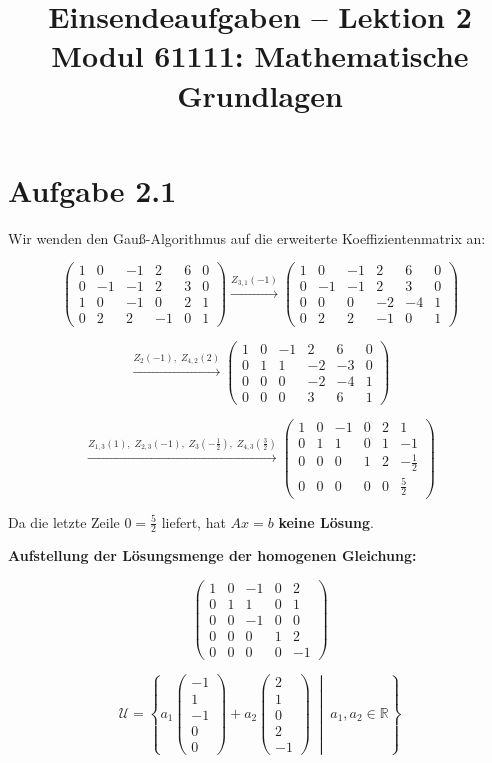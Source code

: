 \documentclass[a4paper,12pt]{article}
\title{Einsendeaufgaben -- Lektion 2\\[0.5em]
\large Modul 61111: Mathematische Grundlagen}
\author{}
\date{}
\begin{document}
\maketitle

\section*{Aufgabe 2.1}

Wir wenden den Gauß-Algorithmus auf die erweiterte Koeffizientenmatrix an:

\[
\left(\begin{array}{ccccc|c}
1 & 0 & -1 & 2 & 6 & 0 \\
0 & -1 & -1 & 2 & 3 & 0 \\
1 & 0 & -1 & 0 & 2 & 1 \\
0 & 2 & 2 & -1 & 0 & 1
\end{array}\right)
\xrightarrow{Z_{3,1}(-1)}
\left(\begin{array}{ccccc|c}
1 & 0 & -1 & 2 & 6 & 0 \\
0 & -1 & -1 & 2 & 3 & 0 \\
0 & 0 & 0 & -2 & -4 & 1 \\
0 & 2 & 2 & -1 & 0 & 1
\end{array}\right)
\]

\[
\xrightarrow{Z_2(-1),\; Z_{4,2}(2)}
\left(\begin{array}{ccccc|c}
1 & 0 & -1 & 2 & 6 & 0 \\
0 & 1 & 1 & -2 & -3 & 0 \\
0 & 0 & 0 & -2 & -4 & 1 \\
0 & 0 & 0 & 3 & 6 & 1
\end{array}\right)
\]

\[
\xrightarrow{Z_{1,3}(1),\; Z_{2,3}(-1),\; Z_3\!\left(-\tfrac{1}{2}\right),\; Z_{4,3}\!\left(\tfrac{3}{2}\right)}
\left(\begin{array}{ccccc|c}
1 & 0 & -1 & 0 & 2 & 1 \\
0 & 1 & 1 & 0 & 1 & -1 \\
0 & 0 & 0 & 1 & 2 & -\tfrac{1}{2} \\
0 & 0 & 0 & 0 & 0 & \tfrac{5}{2}
\end{array}\right)
\]

Da die letzte Zeile $0 = \tfrac{5}{2}$ liefert, hat $Ax = b$ \textbf{keine Lösung}.

\bigskip
\noindent\textbf{Aufstellung der Lösungsmenge der homogenen Gleichung:}

\[
\left(\begin{array}{ccccc}
1 & 0 & -1 & 0 &  2 \\
0 & 1 &  1 & 0 &  1 \\
0 & 0 & -1 & 0 &  0 \\
0 & 0 &  0 & 1 &  2 \\
0 & 0 &  0 & 0 & -1
\end{array}\right)
\]

\[
\mathcal{U} = \left\{
a_1 \begin{pmatrix}-1\\1\\-1\\0\\0\end{pmatrix}
+ a_2 \begin{pmatrix}2\\1\\0\\2\\-1\end{pmatrix}
\;\middle|\; a_1, a_2 \in \mathbb{R}
\right\}
\]
\end{document}
